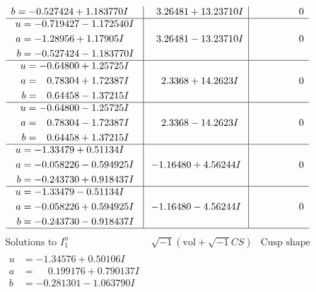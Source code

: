 \documentclass[1p]{elsarticle_modified}
\theoremstyle{definition}
\newcommand{\I}{\sqrt{-1}}
\begin{document}
$$\begin{array}{c|c|c}
\begin{aligned}
b &= -0.527424 + 1.183770 I\end{aligned}
 & \phantom{-}3.26481 + 13.23710 I & \phantom{-0.000000 } 0 \\ \hline\begin{aligned}
u &= -0.719427 - 1.172540 I \\
a &= -1.28956 + 1.17905 I \\
b &= -0.527424 - 1.183770 I\end{aligned}
 & \phantom{-}3.26481 - 13.23710 I & \phantom{-0.000000 } 0 \\ \hline\begin{aligned}
u &= -0.64800 + 1.25725 I \\
a &= \phantom{-}0.78304 + 1.72387 I \\
b &= \phantom{-}0.64458 - 1.37215 I\end{aligned}
 & \phantom{-}2.3368 + 14.2623 I & \phantom{-0.000000 } 0 \\ \hline\begin{aligned}
u &= -0.64800 - 1.25725 I \\
a &= \phantom{-}0.78304 - 1.72387 I \\
b &= \phantom{-}0.64458 + 1.37215 I\end{aligned}
 & \phantom{-}2.3368 - 14.2623 I & \phantom{-0.000000 } 0 \\ \hline\begin{aligned}
u &= -1.33479 + 0.51134 I \\
a &= -0.058226 - 0.594925 I \\
b &= -0.243730 + 0.918437 I\end{aligned}
 & -1.16480 + 4.56244 I & \phantom{-0.000000 } 0 \\ \hline\begin{aligned}
u &= -1.33479 - 0.51134 I \\
a &= -0.058226 + 0.594925 I \\
b &= -0.243730 - 0.918437 I\end{aligned}
 & -1.16480 - 4.56244 I & \phantom{-0.000000 } 0\\
 \hline 
 \end{array}$$\newpage$$\begin{array}{c|c|c}  
\text{Solutions to }I^u_{1}& \I (\text{vol} + \sqrt{-1}CS) & \text{Cusp shape}\\
 \hline 
\begin{aligned}
u &= -1.34576 + 0.50106 I \\
a &= \phantom{-}0.199176 + 0.790137 I \\
b &= -0.281301 - 1.063790 I\end{aligned}

\end{array}$$
\end{document}
